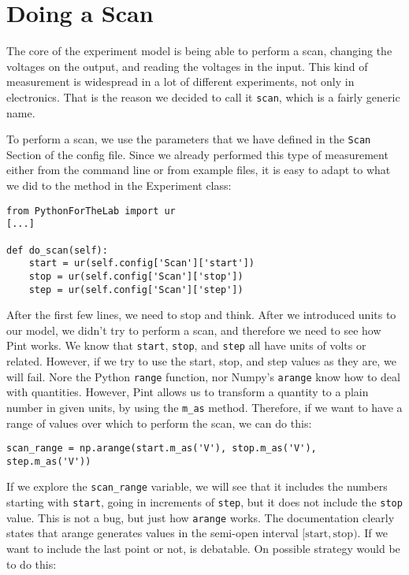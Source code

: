 \section{Doing a Scan}\label{sec:doing-scan}
The core of the experiment model is being able to perform a scan, changing the voltages on the output, and reading the voltages in the input. This kind of measurement is widespread in a lot of different experiments, not only in electronics. That is the reason we decided to call it \texttt{scan}, which is a fairly generic name.


To perform a scan, we use the parameters that we have defined in the \texttt{Scan} Section of the config file. Since we already performed this type of measurement either from the command line or from example files, it is easy to adapt to what we did to the method in the Experiment class:

\begin{verbatim}
from PythonForTheLab import ur
[...]

def do_scan(self):
    start = ur(self.config['Scan']['start'])
    stop = ur(self.config['Scan']['stop'])
    step = ur(self.config['Scan']['step'])
\end{verbatim}

After the first few lines, we need to stop and think. After we introduced units to our model, we didn't try to perform a scan, and therefore we need to see how Pint works. We know that \texttt{start}, \texttt{stop}, and \texttt{step} all have units of volts or related. However, if we try to use the start, stop, and step values as they are, we will fail. Nore the Python \texttt{range} function, nor Numpy's \texttt{arange} know how to deal with quantities. However, Pint allows us to transform a quantity to a plain number in given units, by using the \texttt{m\_as} method. Therefore, if we want to have a range of values over which to perform the scan, we can do this:

\begin{verbatim}
scan_range = np.arange(start.m_as('V'), stop.m_as('V'), step.m_as('V'))
\end{verbatim}

If we explore the \texttt{scan\_range} variable, we will see that it includes the numbers starting with \texttt{start}, going in increments of \texttt{step}, but it does not include the \texttt{stop} value. This is not a bug, but just how \texttt{arange} works. The documentation clearly states that arange generates values in the semi-open interval $[\textrm{start}, \textrm{stop})$. If we want to include the last point or not, is debatable. On possible strategy would be to do this:


